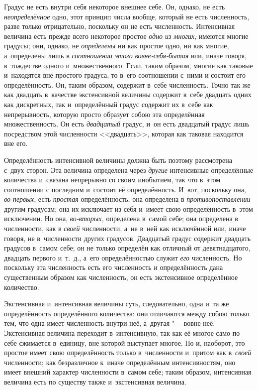 
Градус не есть внутри себя некоторое внешнее себе. Он, однако, не есть
{\em неопределённое} одно, этот принцип числа вообще, который не есть
численность, разве только отрицательно, поскольку он не есть численность.
Интенсивная величина есть прежде всего некоторое простое {\em одно из многих;}
имеются многие градусы; они, однако, не {\em определены} ни как простое одно,
ни как многие, а~определены лишь в {\em соотношении этого вовне-себя-бытия} или,
иначе говоря, в~тождестве одного и~множественного. Если, таким образом, многие
как таковые и~находятся вне простого градуса, то в~его соотношении с~ними и
состоит его определённость. Он, таким образом, содержит в~себе численность.
Точно так же как двадцать в~качестве экстенсивной величины содержит в~себе
двадцать одних как дискретных, так и~определённый градус содержит их в~себе как
непрерывность, которую просто образует собою эта определённая множественность.
Он есть {\em двадцатый} градус, и~он есть двадцатый градус лишь посредством
этой численности <<двадцать>>, которая как таковая находится вне его.

Определённость интенсивной величины должна быть поэтому рассмотрена с~двух
сторон. Эта величина определена через {\em другие} интенсивные определённые
количества и~связана непрерывно со своим инобытием, так что в~этом соотношении
с последним и~состоит её определённость. И~вот, поскольку она, {\em во-первых,}
есть {\em простая} определённость, она определена в {\em противопоставлении}
другим градусам; она их исключает из себя и~имеет свою определённость в~этом
исключении. Но она, {\em во-вторых,} определена в~самой себе; она определена в
численности, как в {\em своей} численности, а~не в~ней как исключённой или,
иначе говоря, не в~численности других градусов. Двадцатый градус содержит
двадцать градусов в~самом себе; он не только определён как отличный от
девятнадцатого, двадцать первого и~т.~д., а~его определённостью служит
{\em его} численность. Но поскольку эта численность есть его численность
и определённость дана существенным образом как численность, он есть
экстенсивное определённое количество.

Экстенсивная и~интенсивная величины суть, следовательно, одна и~та же
определённость определённого количества: они отличаются между собою только тем,
что одна имеет численность внутри неё, а~другая "--- вовне неё.
Экстенсивная величина переходит в~интенсивную, так как её многое само по себе
сжимается в~единицу, вне которой выступает многое. Но и, наоборот, это простое
имеет свою определённость только в~численности и~притом как в~{\em своей}
численности; как безразличное к~иначе определённым интенсивностям, оно имеет
внешний характер численности в~самом себе; таким образом, интенсивная величина
есть по существу также и~экстенсивная величина.

